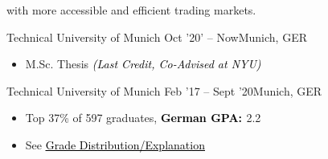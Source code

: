 \documentclass[10pt,a4paper,ragged2e,withhyper]{altacv}
\begin{document}
\begin{paracol}{2}
with more accessible and efficient trading markets.
%

\divider

        {Technical University of Munich}
        {Oct '20' -- Now}{Munich, GER}
\begin{itemize}
\item M.Sc. Thesis {\textcolor{black}{\textit{(Last Credit, Co-Advised at NYU)}}}
\end{itemize}
\divider

        {Technical University of Munich}
        {Feb '17 -- Sept '20}{Munich, GER}
\begin{itemize}
\item Top 37\% of 597 graduates, \textbf{\textcolor{black}{German GPA: }} 2.2 
\item See \href{https://drive.google.com/file/d/1Xesfn8HF9g4oplwqPZMhcFvGFLuyVzIM/view?usp=sharing}{{\textcolor{black}{\underline{Grade Distribution/Explanation}}}}
\end{itemize}


\end{paracol}
\end{document}
